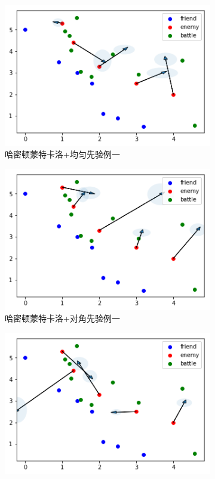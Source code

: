 \documentclass{article}
\begin{document}
\begin{figure}[ht]
  \begin{subfigure}[b]{0.45\linewidth}
    \includegraphics[width=\linewidth]{Sampling11.png}
    \caption{哈密顿蒙特卡洛+均匀先验例一}
  \end{subfigure}
  \begin{subfigure}[b]{0.45\linewidth}
    \includegraphics[width=\linewidth]{Sampling12.png}
    \caption{哈密顿蒙特卡洛+对角先验例一}
  \end{subfigure}
  \begin{subfigure}[b]{0.45\linewidth}
    \includegraphics[width=\linewidth]{Sampling21.png}

\end{subfigure}
\end{figure}
\end{document}

